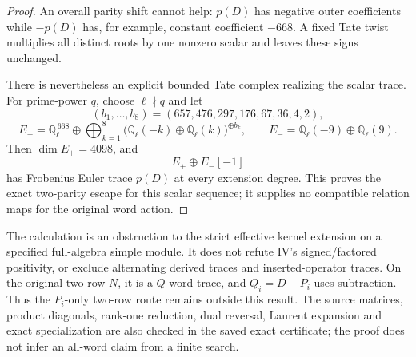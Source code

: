 \documentclass[11pt,a4paper]{article}
\theoremstyle{named}\newtheorem{finding}{Finding}[section]
\theoremstyle{definition}\newtheorem{definition}[finding]{Definition}
\theoremstyle{remark}\newtheorem{remark}[finding]{Remark}
\begin{document}
\begin{proof}
An overall parity shift cannot help:
\(p(D)\) has negative outer coefficients while
\(-p(D)\) has, for example, constant coefficient \(-668\).
A fixed Tate twist multiplies all distinct roots by one
nonzero scalar and leaves these signs unchanged.

There is nevertheless an explicit bounded Tate complex
realizing the scalar trace. For prime-power \(q\), choose
\(\ell\nmid q\) and let
\[
 (b_1,\ldots,b_8)=(657,476,297,176,67,36,4,2),
\]
\[
 E_+=\mathbb Q_\ell^{\,668}
   \oplus\bigoplus_{k=1}^{8}
      \big(\mathbb Q_\ell(-k)\oplus
           \mathbb Q_\ell(k)\big)^{\oplus b_k},
 \qquad
 E_-=\mathbb Q_\ell(-9)\oplus\mathbb Q_\ell(9).
\]
Then \(\dim E_+=4098\), and
\[
 E_+\oplus E_-[-1]
\]
has Frobenius Euler trace \(p(D)\) at every extension degree.
This proves the exact two-parity escape for this scalar
sequence; it supplies no compatible relation maps for
the original word action.
\end{proof}

The calculation is an obstruction to the strict effective
kernel extension on a specified full-algebra simple module.
It does not refute IV's signed/factored positivity, or
exclude alternating derived traces and inserted-operator
traces. On the original two-row \(N\), it is a \(Q\)-word
trace, and \(Q_i=D-P_i\) uses subtraction. Thus the
\(P_i\)-only two-row route remains outside this result.
The source matrices, product diagonals, rank-one reduction,
dual reversal, Laurent expansion and exact specialization
are also checked in the saved exact certificate; the proof
does not infer an all-word claim from a finite search.
\end{document}
